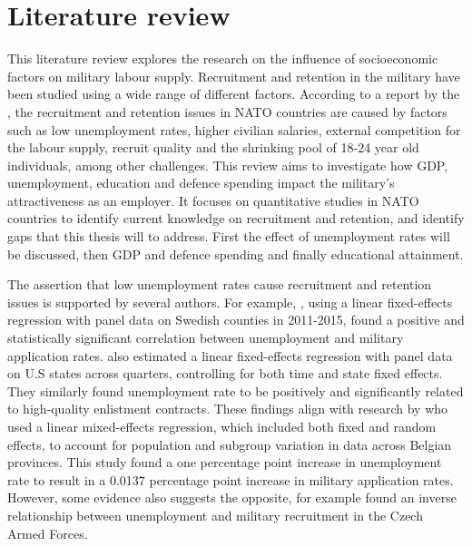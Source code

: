 \chapter{Literature review}

This literature review explores the research on the influence of socioeconomic 
factors on military labour supply. 
Recruitment and retention in the military have been studied using a wide range of
different factors. According to a report by the \textcite{nato_research_and_technology_organization_recruiting_2007}, 
the recruitment and retention issues in NATO countries are 
caused by factors such as low unemployment rates,
higher civilian salaries, external
competition for the labour supply, recruit quality and the shrinking pool of 
18-24 year old individuals, among 
other challenges. This review aims to investigate how 
GDP, unemployment, education and defence spending impact the 
military's attractiveness as an employer. It focuses 
on quantitative studies in NATO countries to identify 
current knowledge on recruitment and retention, and identify 
gaps that this thesis will to address. 
First the effect of unemployment rates will be discussed, then GDP and defence spending 
and finally educational attainment.

The assertion that low unemployment rates 
cause recruitment and retention issues is supported by several authors.
For example, \textcite{backstrom_are_2019}, using a linear fixed-effects regression with panel data 
on Swedish counties in 2011-2015,
found a positive and statistically significant correlation 
between unemployment and military application rates. \textcite{asch_cash_2010} also estimated a
linear fixed-effects regression with panel data on U.S states across quarters, 
controlling for both time and state fixed effects.
They similarly found unemployment rate to be positively and significantly related to
high-quality enlistment contracts. These findings align with 
research by \textcite{balcaen_unemployment_2025} who used a linear mixed-effects regression, 
which included both fixed and random effects, to account for population and subgroup variation
in data across Belgian provinces.
This study found a one percentage point increase in 
unemployment rate to result in a 0.0137 percentage point increase in military 
application rates.
However, some evidence also suggests the opposite, for example 
\textcite{holcner_military_2021} found an inverse relationship between unemployment and military 
recruitment in the Czech Armed Forces.

